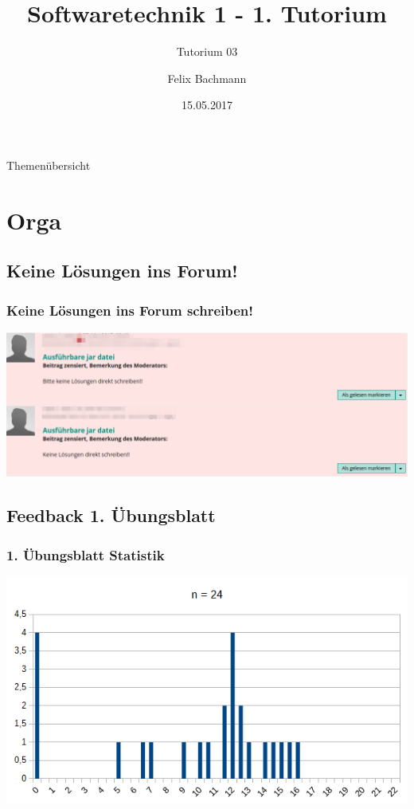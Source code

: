 \documentclass[18pt]{beamer}
\title[SWT1]{Softwaretechnik 1 - 1. Tutorium}
\subtitle{Tutorium 03}
\author{Felix Bachmann}
\date{15.05.2017}
\institute{KIT - Institut für Programmstrukturen und Datenorganisation (IPD)}
\begin{document}

\begin{frame}
\titlepage
\end{frame}

\begin{frame}{Themenübersicht}
\tableofcontents
\end{frame}

\section{Orga}
	\subsection{Keine Lösungen ins Forum!}
	\begin{frame}
		\frametitle{Keine Lösungen ins Forum schreiben!}
		\includegraphics[height=0.85\textheight]{./pics/tut1/censored.png}
	\end{frame}
	
	\subsection{Feedback 1. Übungsblatt}
	\begin{frame}
		\frametitle{1. Übungsblatt Statistik}
		\includegraphics[scale=0.7]{./pics/tut1/statistics_ub1.png}
	\end{frame}
	
\end{document}
